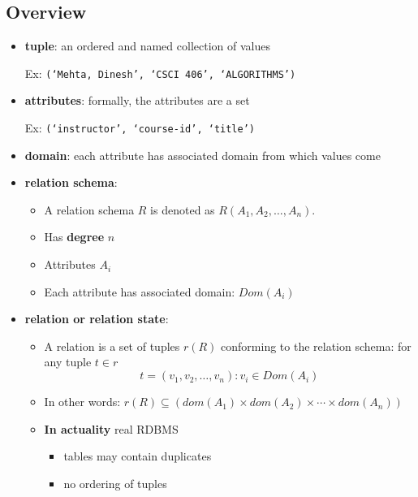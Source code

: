 \documentclass{../cheatsheet}
\begin{document}
\begin{multicols*}{2}
    \section{Overview}
    \begin{itemize}
        \item \textbf{tuple}: an ordered and named collection of values

            Ex: \texttt{(`Mehta, Dinesh', `CSCI 406', `ALGORITHMS')}
        \item \textbf{attributes}: formally, the attributes are a set

            Ex: \texttt{(`instructor', `course-id', `title')}
        \item \textbf{domain}: each attribute has associated domain from which
            values come
        \item \textbf{relation schema}:
            \begin{itemize}
                \item A relation schema $R$ is denoted as $R(A_1,
                    A_2,\dots,A_n)$.
                \item Has \textbf{degree} $n$
                \item Attributes $A_i$
                \item Each attribute has associated domain: $Dom(A_i)$
            \end{itemize}

        \item \textbf{relation or relation state}:
            \begin{itemize}
                \item A relation is a set of tuples $r(R)$ conforming to the
                    relation schema: for any tuple $t \in r$ $$t = (v_1, v_2,
                    \dots, v_n) : v_i \in Dom(A_i)$$

                \item In other words: $r(R) \subseteq (dom(A_1) \times dom(A_2)
                    \times \cdots \times dom(A_n))$

                \item \textbf{In actuality} real RDBMS
                    \begin{itemize}
                        \item tables may contain duplicates
                        \item no ordering of tuples
                    \end{itemize}


\end{itemize}
\end{itemize}
\end{multicols*}
\end{document}
